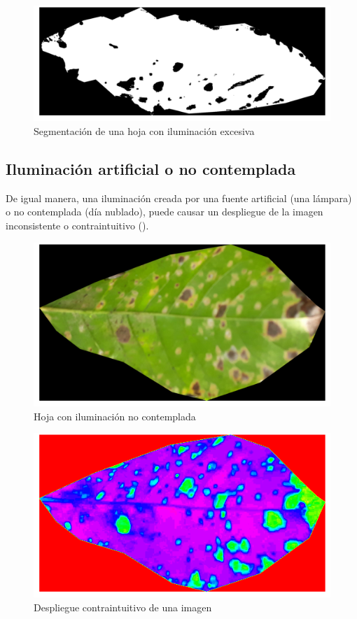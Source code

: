 \begin{figure}[H]
\centering
\includegraphics[scale=1]{images/special_case_light_1_binary.png}
\caption{Segmentación de una hoja con iluminación excesiva}
\label{img:light_1_binary}
\end{figure}

\subsection{Iluminación artificial o no contemplada}
De igual manera, una iluminación creada por una fuente artificial (una lámpara) o no contemplada (día nublado), puede causar un despliegue de la imagen inconsistente o contraintuitivo ().

\begin{figure}[H]
\centering
\includegraphics[scale=1]{images/special_case_light_2_rgb.png}
\caption{Hoja con iluminación no contemplada}
\label{img:light_2_rgb}
\end{figure}

\begin{figure}[H]
\centering
\includegraphics[scale=1]{images/special_case_light_2_hue.png}
\caption{Despliegue contraintuitivo de una imagen}
\label{img:light_2_hue}
\end{figure}

